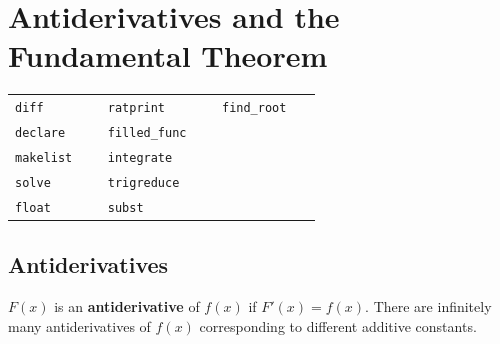 \documentclass[10.5pt,twoside]{report}
\theoremstyle{definition}
\begin{document}
\pagebreak

\chapter{Antiderivatives and the Fundamental Theorem}

\vspace*{\fill}

\minitoc

\vspace*{\fill}


\newline
\newline

\begin{tabular}{l l l}
 \verb|diff   |   &\verb|ratprint   |   &\verb|find_root   |   \\
 \verb|declare   |   &\verb|filled_func   |   &\verb|   |   \\
 \verb|makelist   |   &\verb|integrate   |   &\verb|   |   \\
 \verb|solve   |   &\verb|trigreduce   |   &\verb|   |   \\
 \verb|float   |   &\verb|subst   |   &\verb|   |   \\
\end{tabular}

\pagebreak

\section{Antiderivatives}\label{Antiderivatives}

$F(x)$ is an \textbf{antiderivative} of $f(x)$ if $F'(x)=f(x)$.  There are infinitely many antiderivatives of $f(x)$ corresponding to different additive constants.
\end{document}
